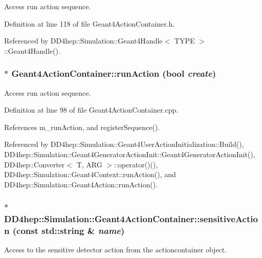 Access run action sequence. 

Definition at line 118 of file Geant4ActionContainer.h.

Referenced by DD4hep::Simulation::Geant4Handle$<$ TYPE $>$::Geant4Handle().\hypertarget{class_d_d4hep_1_1_simulation_1_1_geant4_action_container_a5ce39c42386a93c9e446d8651495c11e}{
\subsubsection[{runAction}]{ $\ast$ Geant4ActionContainer::runAction (bool {\em create})}}
\label{class_d_d4hep_1_1_simulation_1_1_geant4_action_container_a5ce39c42386a93c9e446d8651495c11e}


Access run action sequence. 

Definition at line 98 of file Geant4ActionContainer.cpp.

References m\_\-runAction, and registerSequence().

Referenced by DD4hep::Simulation::Geant4UserActionInitialization::Build(), DD4hep::Simulation::Geant4GeneratorActionInit::Geant4GeneratorActionInit(), DD4hep::Converter$<$ T, ARG $>$::operator()(), DD4hep::Simulation::Geant4Context::runAction(), and DD4hep::Simulation::Geant4Action::runAction().\hypertarget{class_d_d4hep_1_1_simulation_1_1_geant4_action_container_a13189a89fc7c733634c3fe8f898f18d3}{
\subsubsection[{sensitiveAction}]{$\ast$ DD4hep::Simulation::Geant4ActionContainer::sensitiveAction (const std::string \& {\em name})}}
\label{class_d_d4hep_1_1_simulation_1_1_geant4_action_container_a13189a89fc7c733634c3fe8f898f18d3}


Access to the sensitive detector action from the actioncontainer object. 

